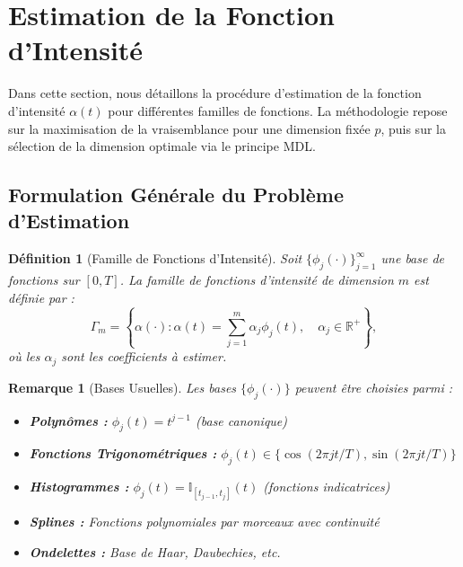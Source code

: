 \documentclass[11pt,a4paper]{article}
\newtheorem{defi}{Définition}[section]
\newtheorem{rem}{Remarque}[section]
\begin{document}
	\section{Estimation de la Fonction d'Intensité}
	\label{sec:estimation_intensite}
	
	Dans cette section, nous détaillons la procédure d'estimation de la fonction d'intensité $\alpha(t)$ pour différentes familles de fonctions. La méthodologie repose sur la maximisation de la vraisemblance pour une dimension fixée $p$, puis sur la sélection de la dimension optimale via le principe MDL.
	
	\subsection{Formulation Générale du Problème d'Estimation}
	\label{subsec:formulation_generale}
	
	\begin{defi}[Famille de Fonctions d'Intensité]
		\label{def:famille_intensite}
		Soit $\{\phi_j(\cdot)\}_{j=1}^{\infty}$ une base de fonctions sur $[0,T]$. La famille de fonctions d'intensité de dimension $m$ est définie par :
		\begin{equation}
			\Gamma_m = \left\{ \alpha(\cdot) : \alpha(t) = \sum_{j=1}^m \alpha_j \phi_j(t), \quad \alpha_j \in \mathbb{R}^+ \right\},
		\end{equation}
		où les $\alpha_j$ sont les coefficients à estimer.
	\end{defi}
	
	\begin{rem}[Bases Usuelles]
		Les bases $\{\phi_j(\cdot)\}$ peuvent être choisies parmi :
		\begin{itemize}
			\item \textbf{Polynômes :} $\phi_j(t) = t^{j-1}$ (base canonique)
			\item \textbf{Fonctions Trigonométriques :} $\phi_j(t) \in \{\cos(2\pi j t/T), \sin(2\pi j t/T)\}$
			\item \textbf{Histogrammes :} $\phi_j(t) = \mathbb{I}_{[t_{j-1}, t_j]}(t)$ (fonctions indicatrices)
			\item \textbf{Splines :} Fonctions polynomiales par morceaux avec continuité
			\item \textbf{Ondelettes :} Base de Haar, Daubechies, etc.
		\end{itemize}
	\end{rem}
	
\end{document}
